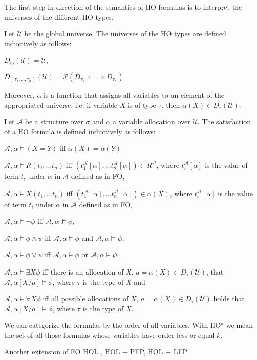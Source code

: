 The first step in direction of the semantics of HO formulas is to interpret the universes of the different HO types.

\begin{definition}
    Let $\mathcal{U}$ be the global universe. The universes of the HO types are defined inductively as follows:
    \begin{compactitem}
        \item $D_\odot(\mathcal{U}) = \mathcal{U}$,
        \item $D_{(\tau_1, \dots, \tau_n)}(\mathcal{U}) = \mathcal{P}(D_{\tau_1} \times \dots \times D_{\tau_n})$
    \end{compactitem}
\end{definition}

Moreover, $\alpha$ is a function that assigns all variables to an element of the appropriated universe, i.e. if
variable $X$ is of type $\tau$, then $\alpha(X) \in D_{\tau}(\mathcal{U})$.

\begin{definition}
    Let $\mathcal{A}$ be a structure over $\sigma$ and $\alpha$ a variable allocation over $\mathcal{U}$. The
    satisfaction of a HO formula is defined inductively as follows:
    \begin{compactitem}
        \item $\mathcal{A}, \alpha \models (X = Y)$ iff $\alpha(X) = \alpha(Y)$
        \item $\mathcal{A}, \alpha \models R(t_1, \dots t_n)$ iff $(t_1^{\mathcal{A}}[\alpha], \dots
        t_n^{\mathcal{A}}[\alpha]) \in R^{\mathcal{A}}$, where $t_i^{\mathcal{A}}[\alpha]$ is the value of term
        $t_i$ under $\alpha$ in $\mathcal{A}$ defined as in FO,
        \item $\mathcal{A}, \alpha \models X(t_1, \dots t_n)$ iff $(t_1^{\mathcal{A}}[\alpha], \dots
        t_n^{\mathcal{A}}[\alpha]) \in \alpha(X)$, where $t_i^{\mathcal{A}}[\alpha]$ is the value of term
        $t_i$ under $\alpha$ in $\mathcal{A}$ defined as in FO,
        \item $\mathcal{A}, \alpha \models \neg\phi$ iff $\mathcal{A}, \alpha\not\models\phi$,
        \item $\mathcal{A}, \alpha \models \phi \wedge \psi$ iff $\mathcal{A}, \alpha\models\phi$ and $\mathcal{A},
        \alpha\models\psi$,
        \item $\mathcal{A}, \alpha \models \phi \vee \psi$ iff $\mathcal{A}, \alpha\models\phi$ or $\mathcal{A},
        \alpha\models\psi$,
        \item $\mathcal{A}, \alpha \models \exists X\phi$ iff there is an allocation of $X$, $a = \alpha(X) \in D_{\tau}
        (\mathcal{U})$, that $\mathcal{A}, \alpha[X/a] \models \phi$, where $\tau$ is the type of $X$ and
        \item $\mathcal{A}, \alpha \models \forall X\phi$ iff all possible allocations of $X$, $a = \alpha(X) \in
        D_{\tau}(\mathcal{U})$ holds that $\mathcal{A}, \alpha[X/a] \models \phi$, where $\tau$ is the type of $X$.
        \end{compactitem}
\end{definition}

We can categorize the formulas by the order of all variables. With HO$^k$ we mean the set of all those formulas whose
variables have order less or equal $k$.

Another extension of FO
HOL , HOL + PFP, HOL + LFP
